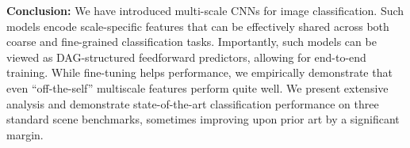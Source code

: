\documentclass[10pt,twocolumn,letterpaper]{article}
\newcommand{\deva}[1]{\textcolor{blue}{[Deva: #1]}}
\begin{document}

{\bf Conclusion:} We have introduced multi-scale CNNs for image classification. Such models encode scale-specific features that can be effectively shared across both coarse and fine-grained classification tasks. Importantly, such models can be viewed as DAG-structured feedforward predictors, allowing for end-to-end training. While fine-tuning helps performance, we empirically demonstrate that even ``off-the-self'' multiscale features perform quite well. We present extensive analysis and demonstrate state-of-the-art classification performance on three standard scene benchmarks, sometimes improving upon prior art by a significant margin. %
\newpage
{\small


}
\end{document}
